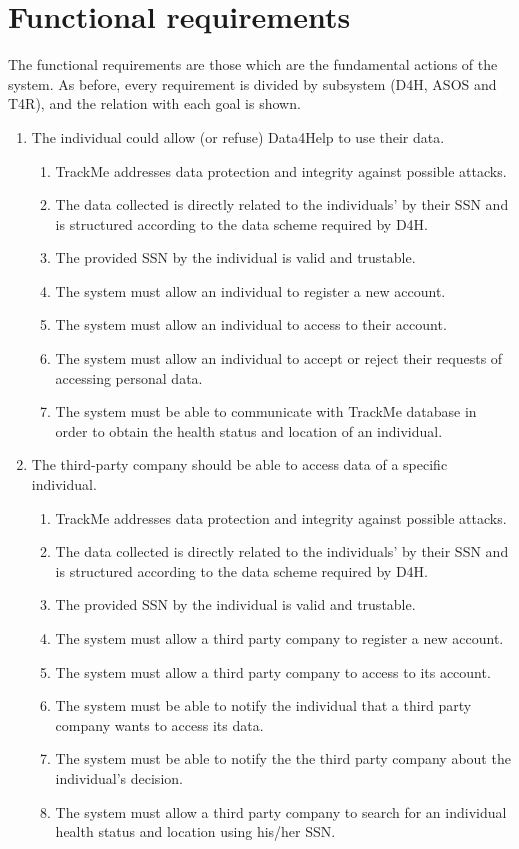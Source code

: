 \documentclass[a4paper, hidelinks, 12pt]{report}
\newcommand\requirement[1]{\item[{[R#1]}] }
\newcommand\goal[1]{\item[{[G#1]}] }
\newcommand\assumption[1]{\item[{[D#1]}] }
\begin{document}
	\section{Functional requirements}
	The functional requirements are those which are the fundamental actions of the system. As before, every requirement is divided by subsystem (D4H, ASOS and T4R), and the relation with each goal is shown.
	
	\begin{enumerate}
		\goal{1} The individual could allow (or refuse) Data4Help to use their data.
		\begin{enumerate}
			\assumption{2} TrackMe addresses data protection and integrity against possible attacks.
			\assumption{4} The data collected is directly related to the individuals' by their SSN and is structured according to the data scheme required by D4H.
			\assumption{5} The provided SSN by the individual is valid and trustable.
			\requirement{1} The system must allow an individual to register a new account.
			\requirement{2} The system must allow an individual to access to their account.
			\requirement{3} The system must allow an individual to accept or reject their requests of accessing personal data.
			\requirement{4} The system must be able to communicate with TrackMe database in order to obtain the health status and location of an individual.
		\end{enumerate}
		
		\goal{2} The third-party company should be able to access data of a specific individual.
		\begin{enumerate}
			\assumption{2} TrackMe addresses data protection and integrity against possible attacks.
			\assumption{4} The data collected is directly related to the individuals' by their SSN and is structured according to the data scheme required by D4H.
			\assumption{5} The provided SSN by the individual is valid and trustable.
			\requirement{5} The system must allow a third party company to register a new account.
			\requirement{6} The system must allow a third party company to access to its account.
			\requirement{7} The system must be able to notify the individual that a third party company wants to access its data.
			\requirement{7.1} The system must be able to notify the the third party company about the individual's decision.
			\requirement{8} The system must allow a third party company to search for an individual health status and location using his/her SSN.
		\end{enumerate}
		

\end{enumerate}
\end{document}
